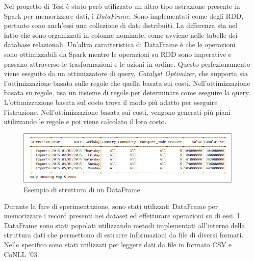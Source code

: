 Nel progetto di Tesi è stato però utilizzato un altro tipo astrazione presente in Spark per memorizzare dati, i \textit{DataFrame}. Sono implementati come degli RDD, pertanto sono anch'essi una collezione di dati distribuiti. La differenza sta nel fatto che sono organizzati in colonne nominate, come avviene nelle tabelle dei database relazionali. Un'altra caratteristica di DataFrame è che le operazioni sono ottimizzabili da Spark mentre le operazioni su RDD sono imperative e passano attraverso le trasformazioni e le azioni in ordine. Questo perfezionamento viene eseguito da un ottimizzatore di query, \textit{Catalyst Optimizer}, che supporta sia l'ottimizzazione basata sulle regole che quella basata sui costi. Nell'ottimizzazione basata su regole, usa un insieme di regole per determinare come eseguire la query. L'ottimizzazione basata sul costo trova il modo più adatto per eseguire l'istruzione. Nell'ottimizzazione basata sui costi, vengono generati più piani utilizzando le regole e poi viene calcolato il loro costo.
\begin{figure}[hbt!]
    \centering
    \includegraphics[width=1\textwidth]{img/dataframe_example.png}
    \caption{Esempio di struttura di un DataFrame}
    \label{fig:dataframe_example}
\end{figure}

Durante la fare di sperimentazione, sono stati utilizzati DataFrame per memorizzare i record presenti nei dataset ed effetturare operazioni su di essi. I DataFrame sono stati popolati utilizzando metodi implementati all'interno della struttura dati che permettono di estrarre informazioni da file di diversi formati. Nello specifico sono stati utilizzati per leggere dati da file in formato CSV e CoNLL '03.